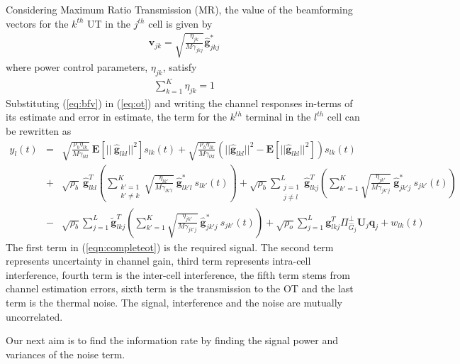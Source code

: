 \documentclass[10pt, a4paper, twoside,fleqn]{article}
\begin{document}
 Considering Maximum Ratio Transmission (MR), the value of the beamforming vectors for the $k^{th}$ UT in the $j^{th}$ cell is given by
\begin{eqnarray}\label{eq:bfv}
	\pmb{v}_{jk} = \sqrt{\frac{\eta_{jk}}{M\gamma_{jkj}}}\pmb{\hat g}^*_{jkj}
\end{eqnarray}
where power control parameters, $\eta_{jk}$, satisfy 
\begin{eqnarray}\label{eqn:etaconstraint}
\sum\limits_{k=1}^{K}\eta_{jk}=1
\end{eqnarray}
Substituting (\ref{eq:bfv}) in (\ref{eq:ot}) and writing the channel responses in-terms of its estimate and error in estimate, the term for the $k^{th}$ terminal in the $l^{th}$ cell can be rewritten as
\begin{eqnarray} \label{eqn:completeot}
	y_{l}(t)  &=& \sqrt{\frac{\rho_b\eta_{lk}}{M\gamma_{lkl}}} \ \pmb{E}[|| \ \pmb{\hat g}_{lkl}||^2]s_{lk}(t)
	           +  \sqrt{\frac{\rho_b\eta_{lk}}{M\gamma_{lkl}}}\left(||\pmb{\hat g}_{lkl}||^2 - \pmb{E}[||\pmb{\hat g}_{lkl}||^2]\right)s_{lk}(t) \nonumber \\    
               &+& \sqrt{\rho_b} \ \pmb{\hat g}_{lkl}^T \left(\sum_{\substack{k'=1 \\ k' \neq k}}^{K} \sqrt{\frac{\eta_{lk'}}{M\gamma_{lk'l}}} \ \pmb{\hat g}^*_{lk'l} \ s_{lk'} (t)\right) 
               + \sqrt{\rho_b} \sum_{\substack{j=1 \\ j \neq l}}^{L} \pmb{\hat g}_{lkj}^T \left(\sum_{k'=1}^{K} \sqrt{\frac{\eta_{jk'}}{M\gamma_{jk'j}}} \ \pmb{\hat g}^*_{jk'j} \ s_{jk'} (t)\right)\nonumber \\
               &-& \sqrt{\rho_b} \sum_{j=1}^{L} \pmb{\widetilde{g}}_{lkj}^T \left(\sum_{k'=1}^{K} \sqrt{\frac{\eta_{jk'}}{M\gamma_{jk'j}}} \ \pmb{\hat g}^*_{jk'j} \ s_{jk'} (t)\right) 
               + \sqrt{\rho_o}\sum_{j=1}^{L}\pmb{g}^T_{lkj} \Pi^{\perp}_{{\widehat{G}_j}} \pmb{U}_j \pmb{q}_{j}
               + w_{lk}(t)      
\end{eqnarray}
The first term in (\ref{eqn:completeot}) is the required signal. The second term represents uncertainty in channel gain, third term represents intra-cell interference, fourth term is the inter-cell interference, the fifth term stems from channel estimation errors, sixth term is the transmission to the OT and the last term is the thermal noise. The signal, interference and the noise are mutually uncorrelated.

Our next aim is to find the information rate by finding the signal power and variances of the noise term. 
\end{document}
